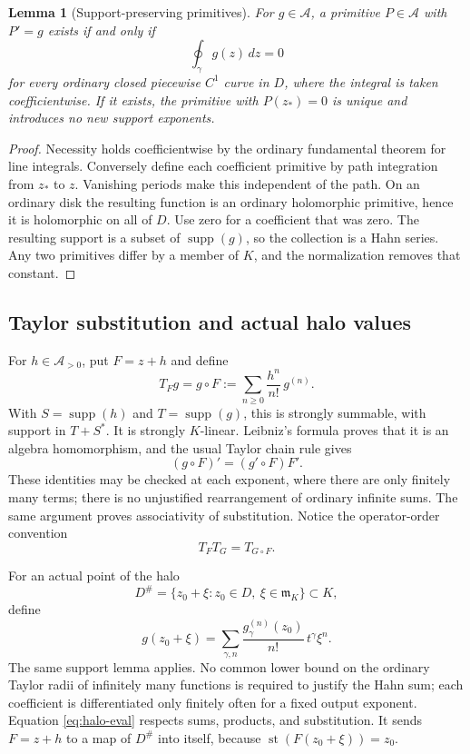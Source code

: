 \documentclass[11pt,a4paper]{article}
\numberwithin{equation}{section}
\newtheorem{lemma}[lemma]{Lemma}
\theoremstyle{definition}
\theoremstyle{remark}
\newcommand{\A}{\mathcal A}
\newcommand{\mm}{\mathfrak m}
\newcommand{\supp}{\operatorname{supp}}
\newcommand{\st}{\operatorname{st}}
\begin{document}
\begin{lemma}[Support-preserving primitives]\label{lem:primitive}
For $g\in\A$, a primitive $P\in\A$ with $P'=g$ exists if and only if
\[
 \oint_\gamma g(z)\,dz=0
\]
for every ordinary closed piecewise $C^1$ curve in $D$, where the integral
is taken coefficientwise.  If it exists, the primitive with $P(z_*)=0$
is unique and introduces no new support exponents.
\end{lemma}
\begin{proof}
Necessity holds coefficientwise by the ordinary fundamental theorem for
line integrals.  Conversely define each coefficient primitive by path
integration from $z_*$ to $z$.  Vanishing periods make this independent of
the path.  On an ordinary disk the resulting function is an ordinary
holomorphic primitive, hence it is holomorphic on all of $D$.  Use zero for
a coefficient that was zero.  The resulting support is a subset of
$\supp(g)$, so the collection is a Hahn series.  Any two primitives differ
by a member of $K$, and the normalization removes that constant.
\end{proof}

\subsection{Taylor substitution and actual halo values}

For $h\in\A_{>0}$, put $F=z+h$ and define
\begin{equation}\label{eq:substitution}
 T_Fg=g\circ F:=\sum_{n\geq0}\frac{h^n}{n!}\,g^{(n)}.
\end{equation}
With $S=\supp(h)$ and $T=\supp(g)$, this is strongly summable, with support
in $T+S^*$.  It is strongly $K$-linear.  Leibniz's formula proves that it
is an algebra homomorphism, and the usual Taylor chain rule gives
\[
 (g\circ F)'=(g'\circ F)F'.
\]
These identities may be checked at each exponent, where there are only
finitely many terms; there is no unjustified rearrangement of ordinary
infinite sums.  The same argument proves associativity of substitution.
Notice the operator-order convention
\begin{equation}\label{eq:antiorder}
 T_FT_G=T_{G\circ F}.
\end{equation}

For an actual point of the halo
\[
 D^\#=\{z_0+\xi:z_0\in D,\ \xi\in\mm_K\}\subset K,
\]
define
\begin{equation}\label{eq:halo-eval}
 g(z_0+\xi)=\sum_{\gamma,n}
      \frac{g_\gamma^{(n)}(z_0)}{n!}\,t^\gamma\xi^n.
\end{equation}
The same support lemma applies.  No common lower bound on the ordinary
Taylor radii of infinitely many functions is required to justify the Hahn
sum; each coefficient is differentiated only finitely often for a fixed
output exponent.  Equation \eqref{eq:halo-eval} respects sums, products, and
substitution.  It sends $F=z+h$ to a map of $D^\#$ into itself, because
$\st(F(z_0+\xi))=z_0$.
\end{document}
